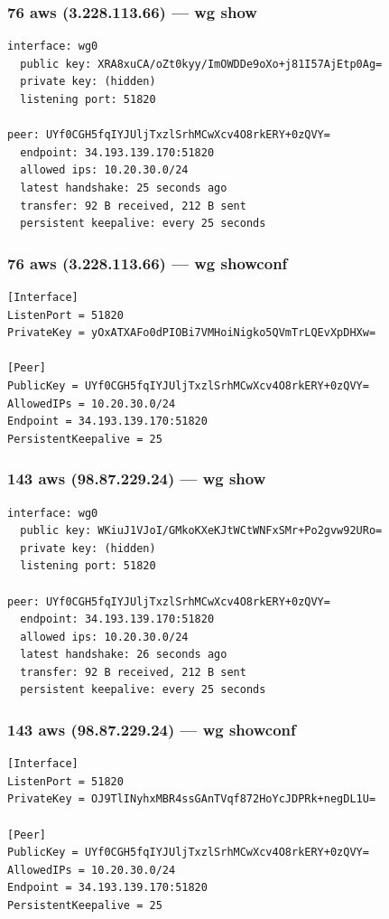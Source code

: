 \documentclass[11pt,a4paper]{article}
\begin{document}
\subsubsection*{76 aws (3.228.113.66) — wg show}
\begin{lstlisting}
interface: wg0
  public key: XRA8xuCA/oZt0kyy/ImOWDDe9oXo+j81I57AjEtp0Ag=
  private key: (hidden)
  listening port: 51820

peer: UYf0CGH5fqIYJUljTxzlSrhMCwXcv4O8rkERY+0zQVY=
  endpoint: 34.193.139.170:51820
  allowed ips: 10.20.30.0/24
  latest handshake: 25 seconds ago
  transfer: 92 B received, 212 B sent
  persistent keepalive: every 25 seconds

\end{lstlisting}

\subsubsection*{76 aws (3.228.113.66) — wg showconf}
\begin{lstlisting}
[Interface]
ListenPort = 51820
PrivateKey = yOxATXAFo0dPIOBi7VMHoiNigko5QVmTrLQEvXpDHXw=

[Peer]
PublicKey = UYf0CGH5fqIYJUljTxzlSrhMCwXcv4O8rkERY+0zQVY=
AllowedIPs = 10.20.30.0/24
Endpoint = 34.193.139.170:51820
PersistentKeepalive = 25

\end{lstlisting}

\subsubsection*{143 aws (98.87.229.24) — wg show}
\begin{lstlisting}
interface: wg0
  public key: WKiuJ1VJoI/GMkoKXeKJtWCtWNFxSMr+Po2gvw92URo=
  private key: (hidden)
  listening port: 51820

peer: UYf0CGH5fqIYJUljTxzlSrhMCwXcv4O8rkERY+0zQVY=
  endpoint: 34.193.139.170:51820
  allowed ips: 10.20.30.0/24
  latest handshake: 26 seconds ago
  transfer: 92 B received, 212 B sent
  persistent keepalive: every 25 seconds

\end{lstlisting}

\subsubsection*{143 aws (98.87.229.24) — wg showconf}
\begin{lstlisting}
[Interface]
ListenPort = 51820
PrivateKey = OJ9TlINyhxMBR4ssGAnTVqf872HoYcJDPRk+negDL1U=

[Peer]
PublicKey = UYf0CGH5fqIYJUljTxzlSrhMCwXcv4O8rkERY+0zQVY=
AllowedIPs = 10.20.30.0/24
Endpoint = 34.193.139.170:51820
PersistentKeepalive = 25

\end{lstlisting}
\end{document}

